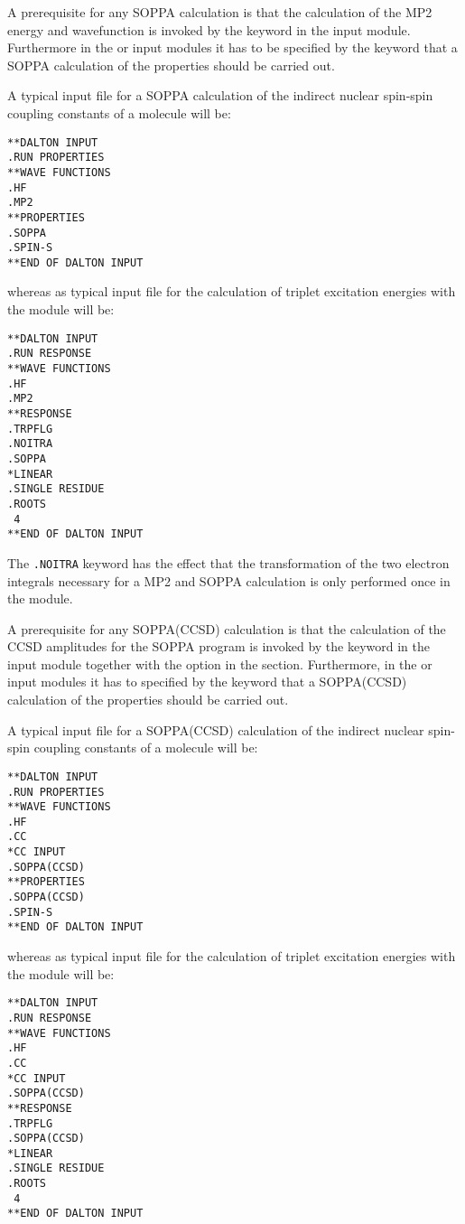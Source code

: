 A prerequisite for any SOPPA calculation is that the calculation of
the MP2 energy and wavefunction is invoked by the keyword  in
the  input module. Furthermore in the
 or  input modules it has to be specified 
by the keyword  that a SOPPA calculation of the properties
should be carried out.

A typical input file for a SOPPA calculation of the indirect nuclear
spin-spin coupling constants of a molecule will be:

\begin{verbatim}
**DALTON INPUT
.RUN PROPERTIES
**WAVE FUNCTIONS
.HF
.MP2
**PROPERTIES
.SOPPA
.SPIN-S
**END OF DALTON INPUT
\end{verbatim}
whereas as typical input file for the calculation of triplet
excitation energies with the
 module will be: 
\begin{verbatim}
**DALTON INPUT
.RUN RESPONSE
**WAVE FUNCTIONS
.HF
.MP2
**RESPONSE
.TRPFLG
.NOITRA
.SOPPA
*LINEAR
.SINGLE RESIDUE
.ROOTS
 4
**END OF DALTON INPUT
\end{verbatim}
The {\tt .NOITRA} keyword has the effect that the transformation of the two 
electron integrals necessary for a MP2 and SOPPA calculation is only performed
once in the  module.

A prerequisite for any SOPPA(CCSD) calculation is that the calculation of
the CCSD amplitudes for the SOPPA program is invoked by the keyword 
in the  input module together with the 
option in the  section. Furthermore, in the  or
 input modules it has to specified by the keyword 
that a SOPPA(CCSD) calculation of the properties should be carried out. 

A typical input file for a SOPPA(CCSD) calculation of the indirect nuclear
spin-spin coupling constants of a molecule will be:

\begin{verbatim}
**DALTON INPUT
.RUN PROPERTIES
**WAVE FUNCTIONS
.HF
.CC
*CC INPUT
.SOPPA(CCSD)
**PROPERTIES
.SOPPA(CCSD)
.SPIN-S
**END OF DALTON INPUT
\end{verbatim}
whereas as typical input file for the calculation of triplet
excitation energies with the
 module will be: 
\begin{verbatim}
**DALTON INPUT
.RUN RESPONSE
**WAVE FUNCTIONS
.HF
.CC
*CC INPUT
.SOPPA(CCSD)
**RESPONSE
.TRPFLG
.SOPPA(CCSD)
*LINEAR
.SINGLE RESIDUE
.ROOTS
 4
**END OF DALTON INPUT
\end{verbatim}


